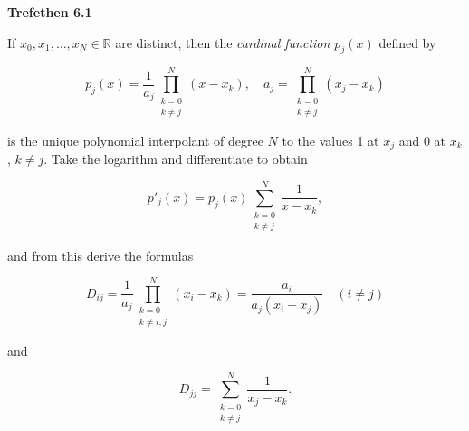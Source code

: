 \textbf{Trefethen 6.1}

If $x_0, x_1, \ldots, x_N \in \mathbb{R}$ are distinct, then the \textit{cardinal function $p_j(x)$} defined by 

$$
p_j(x) = \frac{1}{a_j} \prod\limits_{\substack{k=0 \\ k \neq j}}^{N}(x - x_k), \quad a_j = \prod\limits_{\substack{k=0 \\ k \neq j}}^{N}(x_j - x_k)
$$

is the unique polynomial interpolant of degree $N$ to the values 1 at $x_j$ and 0 at $x_k$, $k \neq j$. Take the 
logarithm and differentiate to obtain 

$$
p'_j(x) = p_j(x) \sum\limits_{\substack{k=0 \\ k \neq j}}^N \frac{1}{x - x_k},
$$

and from this derive the formulas

$$
D_{ij} = \frac{1}{a_j} \prod\limits_{\substack{k=0 \\ k \neq i,j}}^N (x_i - x_k) = \frac{a_i}{a_j(x_i - x_j)} \quad (i \neq j)
$$

and 

$$
D_{jj} = \sum\limits_{\substack{k=0 \\ k \neq j}}^N \frac{1}{x_j - x_k}.
$$

\begin{solution}
  \ \\
  \vfill
\end{solution}
